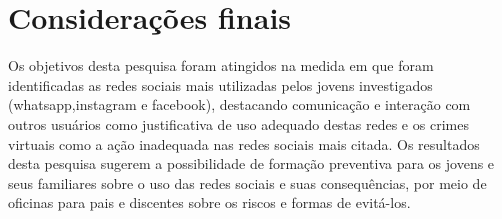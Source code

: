 \section{Considerações finais}

Os objetivos desta pesquisa foram atingidos na
medida em que foram identificadas as redes sociais
mais utilizadas pelos jovens investigados (whatsapp,instagram e facebook), destacando
comunicação e interação com outros usuários como
justificativa de uso adequado destas redes e os crimes virtuais como a ação inadequada nas redes sociais mais citada.
Os resultados desta pesquisa sugerem a
possibilidade de formação preventiva para os jovens e seus familiares sobre o uso das redes sociais e suas consequências, por meio de oficinas para pais e discentes sobre os riscos e formas de evitá-los.\cite{feitosa2016} 
